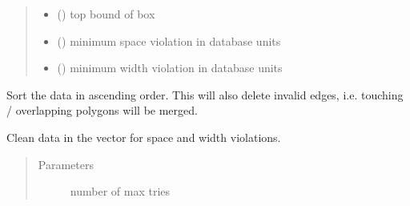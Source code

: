 \documentclass[a4paper,10pt,english]{sphinxmanual}
\begin{document}
\begin{fulllineitems}
\begin{fulllineitems}
\begin{quote}
\begin{description}
\begin{itemize}
\item {} 
 () \textendash{} top bound of box

\item {} 
 () \textendash{} minimum space violation in database units

\item {} 
 () \textendash{} minimum width violation in database units

\end{itemize}

\end{description}\end{quote}

\end{fulllineitems}


\begin{fulllineitems}
\label{\detokenize{drc:drc.drc.slcleaner.PyDrcSl.sort}}
Sort the data in ascending order. This will also delete invalid edges, i.e. touching / overlapping polygons will be merged.

\end{fulllineitems}


\begin{fulllineitems}
\label{\detokenize{drc:drc.drc.slcleaner.PyDrcSl.clean}}
Clean data in the vector for space and width violations.
\begin{quote}\begin{description}
\item[{Parameters}] \leavevmode
{} \textendash{} number of max tries

\end{description}\end{quote}

\end{fulllineitems}


\end{fulllineitems}
\end{document}
